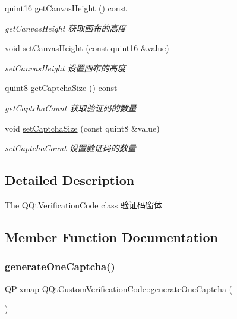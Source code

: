 \begin{DoxyCompactItemize}
quint16 \mbox{\hyperlink{class_q_qt_custom_verification_code_afb6a96e821e50c872b455b0c1fa77879}{get\+Canvas\+Height}} () const
\begin{DoxyCompactList}\small\item\em get\+Canvas\+Height 获取画布的高度 \end{DoxyCompactList}\item 
void \mbox{\hyperlink{class_q_qt_custom_verification_code_ab1eadf9434141d948142b26d3917aff2}{set\+Canvas\+Height}} (const quint16 \&value)
\begin{DoxyCompactList}\small\item\em set\+Canvas\+Height 设置画布的高度 \end{DoxyCompactList}\item 
quint8 \mbox{\hyperlink{class_q_qt_custom_verification_code_a4e87faca32965398ee697f7c44bb05aa}{get\+Captcha\+Size}} () const
\begin{DoxyCompactList}\small\item\em get\+Captcha\+Count 获取验证码的数量 \end{DoxyCompactList}\item 
void \mbox{\hyperlink{class_q_qt_custom_verification_code_a93f46516afd27edb00b9330be16f28c4}{set\+Captcha\+Size}} (const quint8 \&value)
\begin{DoxyCompactList}\small\item\em set\+Captcha\+Count 设置验证码的数量 \end{DoxyCompactList}\end{DoxyCompactItemize}


\subsection{Detailed Description}
The Q\+Qt\+Verification\+Code class 验证码窗体 

\subsection{Member Function Documentation}
\mbox{\label{class_q_qt_custom_verification_code_a033f0fe414236d0bce2a5d91911be711}} 
\subsubsection{\texorpdfstring{generate\+One\+Captcha()}{generateOneCaptcha()}}
{\footnotesize\ttfamily Q\+Pixmap Q\+Qt\+Custom\+Verification\+Code\+::generate\+One\+Captcha (\begin{DoxyParamCaption}{ }\end{DoxyParamCaption})}



